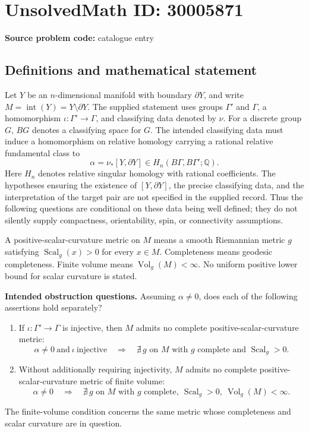 \documentclass[11pt]{article}
\newcommand{\Q}{\mathbb{Q}}
\begin{document}
\section*{UnsolvedMath ID: 30005871}
\textbf{Source problem code:} catalogue entry
\subsection{Definitions and mathematical statement}
Let \(Y\) be an \(n\)-dimensional manifold with boundary \(\partial Y\), and write \(M=\operatorname{int}(Y)=Y\setminus\partial Y\). The supplied statement uses groups \(\Gamma'\) and \(\Gamma\), a homomorphism \(\iota\colon\Gamma'\to\Gamma\), and classifying data denoted by \(\nu\). For a discrete group \(G\), \(BG\) denotes a classifying space for \(G\). The intended classifying data must induce a homomorphism on relative homology carrying a rational relative fundamental class to
\[
\alpha=\nu_*[Y,\partial Y]\in H_n(B\Gamma,B\Gamma';\Q).
\]
Here \(H_n\) denotes relative singular homology with rational coefficients. The hypotheses ensuring the existence of \([Y,\partial Y]\), the precise classifying data, and the interpretation of the target pair are not specified in the supplied record. Thus the following questions are conditional on these data being well defined; they do not silently supply compactness, orientability, spin, or connectivity assumptions.

A positive-scalar-curvature metric on \(M\) means a smooth Riemannian metric \(g\) satisfying \(\operatorname{Scal}_g(x)>0\) for every \(x\in M\). Completeness means geodesic completeness. Finite volume means \(\operatorname{Vol}_g(M)<\infty\). No uniform positive lower bound for scalar curvature is stated.

\textbf{Intended obstruction questions.} Assuming \(\alpha\ne0\), does each of the following assertions hold separately?
\begin{enumerate}
\item If \(\iota\colon\Gamma'\to\Gamma\) is injective, then \(M\) admits no complete positive-scalar-curvature metric:
\[
\alpha\ne0\ \text{and}\ \iota\ \text{injective}
\quad\Longrightarrow\quad
\nexists\,g\text{ on }M\text{ with }g\text{ complete and }\operatorname{Scal}_g>0.
\]
\item Without additionally requiring injectivity, \(M\) admits no complete positive-scalar-curvature metric of finite volume:
\[
\alpha\ne0
\quad\Longrightarrow\quad
\nexists\,g\text{ on }M\text{ with }g\text{ complete},\
\operatorname{Scal}_g>0,\
\operatorname{Vol}_g(M)<\infty.
\]
\end{enumerate}
The finite-volume condition concerns the same metric whose completeness and scalar curvature are in question.
\end{document}
